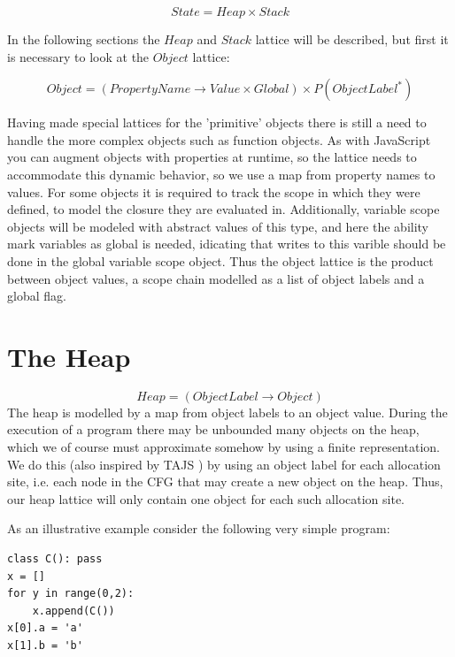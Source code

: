 \begin{equation*}
State = Heap \times Stack
\end{equation*}

In the following sections the $Heap$ and $Stack$ lattice will be described, but first it is necessary to look at the $Object$ lattice:

\begin{equation*}
Object = (PropertyName \rightarrow Value \times Global) \times P(ObjectLabel^{*})
\end{equation*}

Having made special lattices for the 'primitive' objects there is still a need to handle the more complex objects such as function objects. As with JavaScript you can augment objects with properties at runtime, so the lattice needs to accommodate this dynamic behavior, so we use a map from property names to values. For some objects it is required to track the scope in which they were defined, to model the closure they are evaluated in. Additionally, variable scope objects will be modeled with abstract values of this type, and here the ability mark variables as global is needed, idicating that writes to this varible should be done in the global variable scope object. Thus the object lattice is the product between object values, a scope chain modelled as a list of object labels and a global flag.


\section{The Heap}
\label{The Heap}
\begin{equation*}
Heap = (ObjectLabel \rightarrow Object)
\end{equation*}
The heap is modelled by a map from object labels to an object value. During the execution of a program there may be unbounded many objects on the heap, which we of course must approximate somehow by using a finite representation. We do this (also inspired by TAJS \cite{tajs}) by using an object label for each allocation site, i.e. each node in the CFG that may create a new object on the heap. Thus, our heap lattice will only contain one object for each such allocation site.

As an illustrative example consider the following very simple program:

\begin{listing}[H]
	\begin{verbatim}
class C(): pass
x = []
for y in range(0,2):
	x.append(C())
x[0].a = 'a'
x[1].b = 'b'
	\end{verbatim}
\end{listing}

